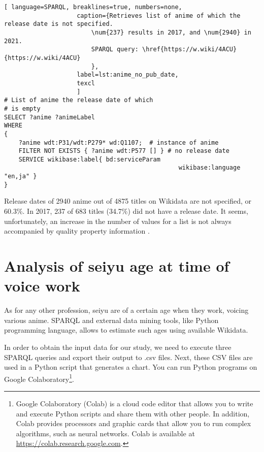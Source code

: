 \begin{lstlisting}[ language=SPARQL, breaklines=true, numbers=none,
                    caption={Retrieves list of anime of which the release date is not specified.
                        \num{237} results in 2017, and \num{2940} in 2021.
                        SPARQL query: \href{https://w.wiki/4ACU}{https://w.wiki/4ACU}
                        },
                    label=lst:anime_no_pub_date,
                    texcl 
                    ]
# List of anime the release date of which
# is empty
SELECT ?anime ?animeLabel
WHERE
{
    ?anime wdt:P31/wdt:P279* wd:Q1107;  # instance of anime
    FILTER NOT EXISTS { ?anime wdt:P577 [] } # no release date
    SERVICE wikibase:label{ bd:serviceParam
			  									wikibase:language "en,ja" }
}
\end{lstlisting}%

Release dates of \num{2940} anime out of \num{4875} titles on Wikidata are not specified, 
or \num{60.3}\%. In 2017, \num{237} of \num{683} titles (\num{34.7}\%) 
did not have a release date. 
It seems, unfortunately, 
an increase in the number of values for a list 
is not always accompanied by quality property information%
%
.

\section{Analysis of seiyu age at time of voice work}

As for any other profession, seiyu are of a certain age when they work, voicing various anime. 
SPARQL and external data mining tools, 
like Python%
programming language, 
allows to estimate such ages using available Wikidata.


In order to obtain the input data for our study, 
we need to execute three SPARQL queries and export their output to .csv%
files. Next, these CSV files are used in a Python script that generates a chart. 
You can run Python programs on Google Colaboratory\footnote{Google Colaboratory (Colab) is a cloud code editor that allows you to write and execute Python scripts and share them with other people. In addition, Colab provides processors and graphic cards that allow you to run complex algorithms, such as neural networks. Colab is available at \href{https://colab.research.google.com}{https://colab.research.google.com}.}.

